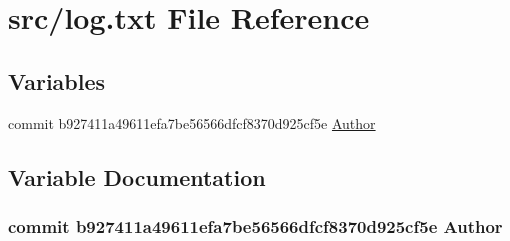 \hypertarget{log_8txt}{}\section{src/log.txt File Reference}
\label{log_8txt}
\subsection*{Variables}
\begin{DoxyCompactItemize}
\item 
commit b927411a49611efa7be56566dfcf8370d925cf5e \hyperlink{log_8txt_a2153263aadf46404cd10eee1053d8cb2}{Author}
\end{DoxyCompactItemize}


\subsection{Variable Documentation}
\subsubsection[{\texorpdfstring{Author}{Author}}]{\setlength{\rightskip}{0pt plus 5cm}commit b927411a49611efa7be56566dfcf8370d925cf5e Author}\hypertarget{log_8txt_a2153263aadf46404cd10eee1053d8cb2}{}\label{log_8txt_a2153263aadf46404cd10eee1053d8cb2}
